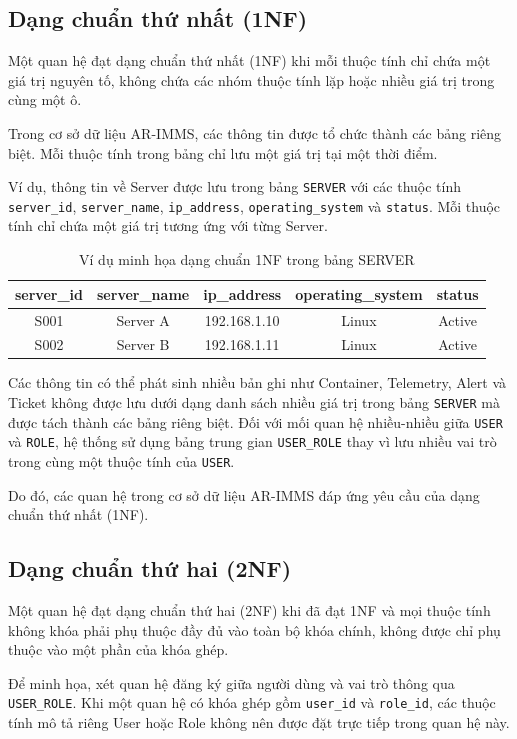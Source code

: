 \subsection{Dạng chuẩn thứ nhất (1NF)}
Một quan hệ đạt dạng chuẩn thứ nhất (1NF) khi mỗi thuộc tính chỉ chứa một giá trị nguyên tố, không chứa các nhóm thuộc tính lặp hoặc nhiều giá trị trong cùng một ô.

Trong cơ sở dữ liệu AR-IMMS, các thông tin được tổ chức thành các bảng riêng biệt. Mỗi thuộc tính trong bảng chỉ lưu một giá trị tại một thời điểm.

Ví dụ, thông tin về Server được lưu trong bảng \texttt{SERVER} với các thuộc tính \texttt{server\_id}, \texttt{server\_name}, \texttt{ip\_address}, \texttt{operating\_system} và \texttt{status}. Mỗi thuộc tính chỉ chứa một giá trị tương ứng với từng Server.

\begin{table}[H]
\centering
\caption{Ví dụ minh họa dạng chuẩn 1NF trong bảng SERVER}
\begin{tabular}{|c|c|c|c|c|}
\hline
\textbf{server\_id} & \textbf{server\_name} & \textbf{ip\_address} & \textbf{operating\_system} & \textbf{status} \\ \hline
S001 & Server A & 192.168.1.10 & Linux & Active \\ \hline
S002 & Server B & 192.168.1.11 & Linux & Active \\ \hline
\end{tabular}
\end{table}

Các thông tin có thể phát sinh nhiều bản ghi như Container, Telemetry, Alert và Ticket không được lưu dưới dạng danh sách nhiều giá trị trong bảng \texttt{SERVER} mà được tách thành các bảng riêng biệt. Đối với mối quan hệ nhiều-nhiều giữa \texttt{USER} và \texttt{ROLE}, hệ thống sử dụng bảng trung gian \texttt{USER\_ROLE} thay vì lưu nhiều vai trò trong cùng một thuộc tính của \texttt{USER}.

Do đó, các quan hệ trong cơ sở dữ liệu AR-IMMS đáp ứng yêu cầu của dạng chuẩn thứ nhất (1NF).

\subsection{Dạng chuẩn thứ hai (2NF)}
Một quan hệ đạt dạng chuẩn thứ hai (2NF) khi đã đạt 1NF và mọi thuộc tính không khóa phải phụ thuộc đầy đủ vào toàn bộ khóa chính, không được chỉ phụ thuộc vào một phần của khóa ghép.

Để minh họa, xét quan hệ đăng ký giữa người dùng và vai trò thông qua \texttt{USER\_ROLE}. Khi một quan hệ có khóa ghép gồm \texttt{user\_id} và \texttt{role\_id}, các thuộc tính mô tả riêng User hoặc Role không nên được đặt trực tiếp trong quan hệ này.

